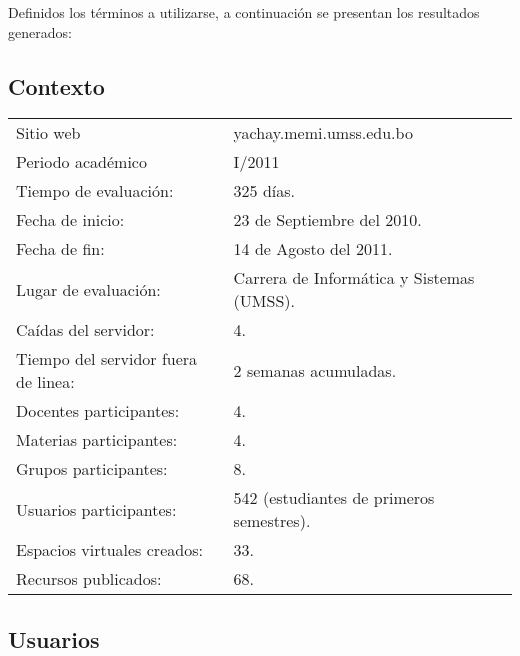Definidos los términos a utilizarse, a continuación se presentan los resultados
generados:

\subsection{Contexto}
\begin{center}
\begin{tabular}{|l|l|}
\hline
Sitio web & yachay.memi.umss.edu.bo \\
Periodo académico & I/2011 \\
Tiempo de evaluación: & 325 días. \\
Fecha de inicio: & 23 de Septiembre del 2010. \\
Fecha de fin: & 14 de Agosto del 2011. \\
Lugar de evaluación: & Carrera de Informática y Sistemas (UMSS). \\
Caídas del servidor: & 4. \\
Tiempo del servidor fuera de linea: & 2 semanas acumuladas. \\
Docentes participantes: & 4. \\
Materias participantes: & 4. \\
Grupos participantes: & 8. \\
Usuarios participantes: & 542 (estudiantes de primeros semestres). \\
Espacios virtuales creados: & 33. \\
Recursos publicados: & 68. \\
\hline
\end{tabular}
\end{center}

\subsection{Usuarios}



